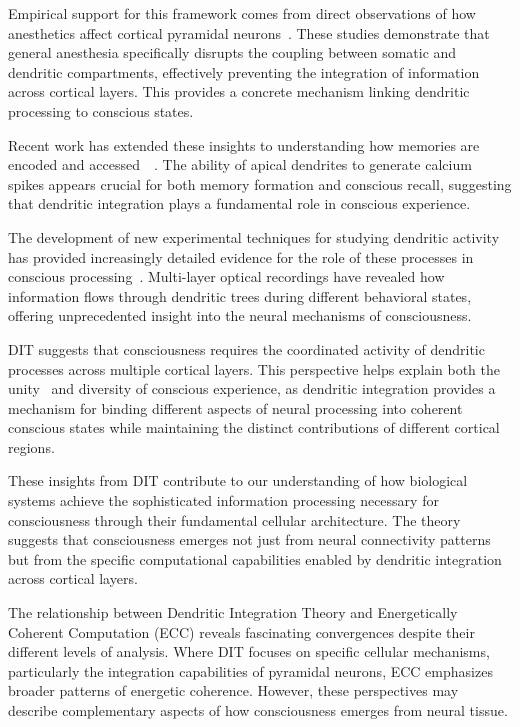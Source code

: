 Empirical support for this framework comes from direct observations of how anesthetics affect cortical pyramidal neurons~\cite{Suzuki2020, Phillips2018}. These studies demonstrate that general anesthesia specifically disrupts the coupling between somatic and dendritic compartments, effectively preventing the integration of information across cortical layers. This provides a concrete mechanism linking dendritic processing to conscious states.

Recent work has extended these insights to understanding how memories are encoded and accessed~~\cite{Shin2021, Bicknell2021}. The ability of apical dendrites to generate calcium spikes appears crucial for both memory formation and conscious recall, suggesting that dendritic integration plays a fundamental role in conscious experience.

The development of new experimental techniques for studying dendritic activity has provided increasingly detailed evidence for the role of these processes in conscious processing~. Multi-layer optical recordings have revealed how information flows through dendritic trees during different behavioral states, offering unprecedented insight into the neural mechanisms of consciousness.

DIT suggests that consciousness requires the coordinated activity of dendritic processes across multiple cortical layers. This perspective helps explain both the unity~ and diversity of conscious experience, as dendritic integration provides a mechanism for binding different aspects of neural processing into coherent conscious states while maintaining the distinct contributions of different cortical regions.

These insights from DIT contribute to our understanding of how biological systems achieve the sophisticated information processing necessary for consciousness through their fundamental cellular architecture. The theory suggests that consciousness emerges not just from neural connectivity patterns but from the specific computational capabilities enabled by dendritic integration across cortical layers.

The relationship between Dendritic Integration Theory and Energetically Coherent Computation (ECC) reveals fascinating convergences despite their different levels of analysis. Where DIT focuses on specific cellular mechanisms, particularly the integration capabilities of pyramidal neurons, ECC emphasizes broader patterns of energetic coherence. However, these perspectives may describe complementary aspects of how consciousness emerges from neural tissue.

